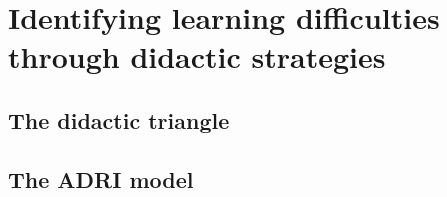 \chapter{Identifying learning difficulties through didactic strategies}

\section{The didactic triangle}

\section{The ADRI model}